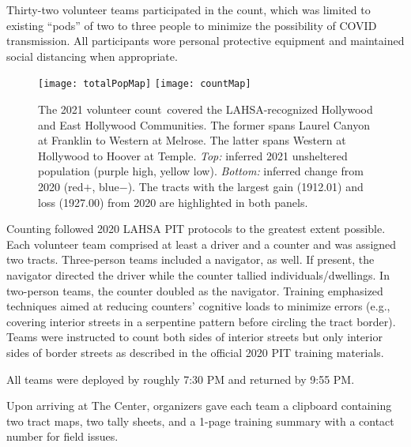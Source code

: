 \documentclass[11pt,twocolumn]{article}
\def\Count{count}
\begin{document}
Thirty-two volunteer teams participated in the \Count, which was limited to existing ``pods'' of two 
to three people to minimize the possibility of COVID transmission. 
All participants wore 
personal protective equipment and maintained social distancing when appropriate.

\begin{figure}[t!]
	\centering
	\texttt{[image: totalPopMap]}
	\texttt{[image: countMap]}
	\caption{The 2021 volunteer \Count\ covered the LAHSA-recognized Hollywood and East 
			Hollywood Communities. The former spans Laurel Canyon at Franklin to Western
			at Melrose. The latter spans Western at Hollywood to Hoover at Temple. 
			{\it Top:} inferred 2021 unsheltered population (purple high, yellow low). 
			{\it Bottom:} inferred change from 2020 (red$+$, blue$-$). The tracts with the 
			largest gain (1912.01) and loss (1927.00) from 2020 are highlighted
			in both panels.}
	\label{fig:map}	
\end{figure}

Counting followed 2020 LAHSA PIT protocols to the greatest extent possible. Each volunteer team 
comprised at least a driver and a counter and was assigned two tracts. Three-person teams 
included a navigator, as well. If present, the navigator directed the driver while the counter tallied 
individuals/dwellings. In two-person teams, the counter doubled as the navigator. Training 
emphasized techniques aimed at reducing counters' cognitive loads to minimize errors (e.g., 
covering interior streets in a serpentine pattern before circling the tract border). Teams were 
instructed to count both sides of interior streets but only interior sides of border streets 
as described in the official 2020 PIT training materials.

All teams were deployed by roughly 7:30 PM and returned by 9:55 PM.

Upon arriving at The Center, organizers gave each team a clipboard containing two tract maps,
two tally sheets, and a 1-page training summary with a contact number for field issues.
\end{document}
